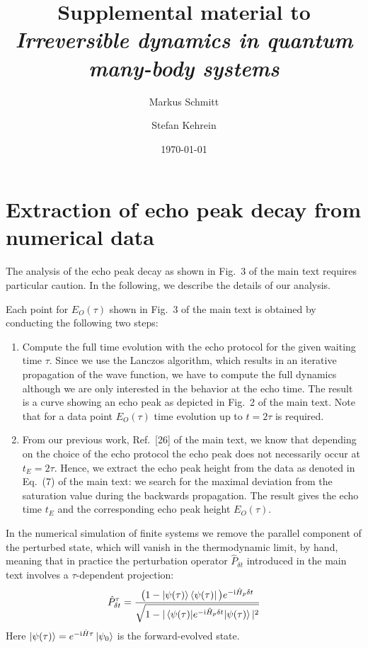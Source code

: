 \documentclass[%
 reprint,
 amsmath,amssymb,
 prl,
]{revtex4-1}
\newcommand{\im}{\mathrm{i}}
\begin{document}
\title{Supplemental material to\\\emph{Irreversible dynamics in quantum many-body systems}}


\author{Markus Schmitt}
\author{Stefan Kehrein}
\date{\today}

\maketitle

\section{Extraction of echo peak decay from numerical data}
The analysis of the echo peak decay as shown in Fig.\ 3 of the main text requires particular caution.
In the following, we describe the details of our analysis. 

Each point for $E_O(\tau)$ shown in Fig.\ 3 of the main text is obtained by conducting the following two steps:
\begin{enumerate}
\item Compute the full time evolution with the echo protocol for the given waiting time $\tau$. Since we use the Lanczos algorithm, which results in an iterative propagation of the wave function, we have to compute the full dynamics although we are only interested in the behavior at the echo time. The result is a curve showing an echo peak as depicted in Fig.\ 2 of the main text. Note that for a data point $E_O(\tau)$ time evolution up to $t=2\tau$ is required.
\item From our previous work, Ref.\ [26] of the main text, we know that depending on the choice of the echo protocol the echo peak does not necessarily occur at $t_E=2\tau$. Hence, we extract the echo peak height from the data as denoted in Eq.\ (7) of the main text: we search for the maximal deviation from the saturation value during the backwards propagation. The result gives the echo time $t_E$ and the corresponding echo peak height $E_O(\tau)$.
\end{enumerate}

In the numerical simulation of finite systems we remove the parallel component of the perturbed state, which will vanish in the thermodynamic limit, by hand, meaning that in practice the perturbation operator $\hat P_{\delta t}$ introduced in the main text involves a $\tau$-dependent projection:
\begin{align}
	\hat P_{\delta t}^\tau=\frac{\big(1-\ket{\psi(\tau)}\bra{\psi(\tau)}\big)e^{-\im\hat H_p\delta t}}{\sqrt{1-|\braket{\psi(\tau)|e^{-\im\hat H_p\delta t}|\psi(\tau)}|^2}}
\end{align}
Here $\ket{\psi(\tau)}=e^{-\im\hat H\tau}\ket{\psi_0}$ is the forward-evolved state.
\end{document}
